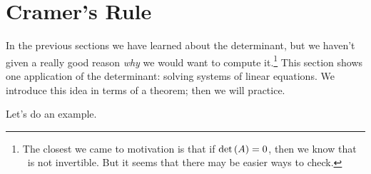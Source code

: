 \section{Cramer's Rule}\label{sec:cramer}



In the previous sections we have learned about the determinant, but we haven't given a really good reason \textit{why} we would want to compute it.\footnote{The closest we came to motivation is that if $\text{det}\left(A\right) =0$, then we know that \tta\ is not invertible. But it seems that there may be easier ways to check.} This section shows one application of the determinant: solving systems of linear equations. We introduce this idea in terms of a theorem; then we will practice.


Let's do an example.\\


